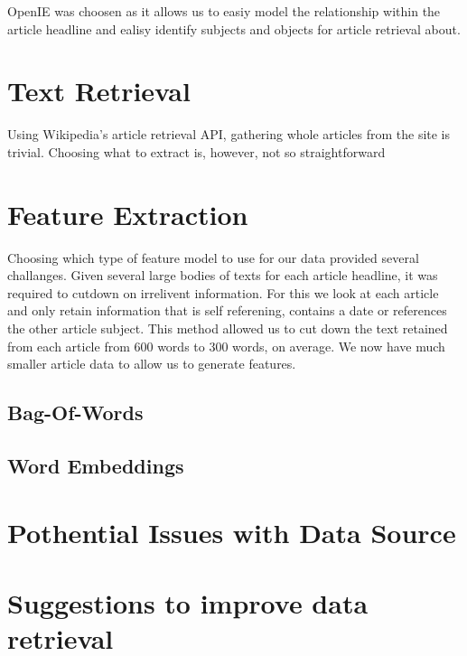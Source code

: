 \documentclass[12pt]{report}
\begin{document}
        OpenIE was choosen as it allows us to easiy model the relationship within the article headline
        and ealisy identify subjects and objects for article retrieval about.

        \section{Text Retrieval} %
        Using Wikipedia's article retrieval API, gathering whole articles from
        the site is trivial. Choosing what to extract is, however, not
        so straightforward

        \section{Feature Extraction}
                Choosing which type of feature model to use for our data provided several challanges.
                Given several large bodies of texts for each article headline, it was required to cutdown
                on irrelivent information.
                For this we look at each article and only retain information that is self referening, contains
                a date or references the other article subject.
                This method allowed us to cut down the text retained from each article from 600 words \cite{WikiStats}
                to 300 words, on average. %
                We now have much smaller article data to allow us to generate features.

                
                \subsection{Bag-Of-Words}
                \subsection{Word Embeddings}
        \section{Pothential Issues with Data Source}
        \section{Suggestions to improve data retrieval}
\end{document}
